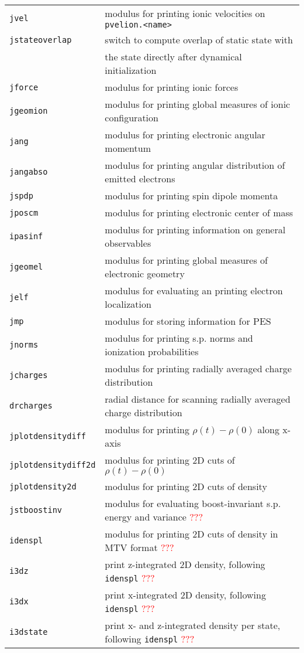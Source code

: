 \documentclass[12pt]{article}
\begin{document}
\begin{tabular}{ll}
\\
{\tt jvel}           & modulus for printing ionic velocities on {\tt pvelion.<name>}
\\
{\tt jstateoverlap}  & switch to compute overlap of static state
                       with\\
                     & the state directly after dynamical
                       initialization
\\
{\tt jforce} & modulus for printing ionic forces \\
{\tt jgeomion} &  modulus for printing global measures of ionic configuration \\
{\tt jang} & modulus for printing electronic angular momentum  \\
{\tt jangabso} &  modulus for printing angular distribution of emitted
electrons\\
{\tt jspdp} &  modulus for printing spin dipole momenta \\
{\tt jposcm} &  modulus for printing electronic center of mass \\
{\tt ipasinf} &  modulus for printing information on general observables\\
{\tt jgeomel} &   modulus for printing global measures of electronic geometry \\
{\tt jelf} &  modulus for evaluating an printing electron localization\\
{\tt jmp} & modulus for storing information for PES \\
{\tt jnorms} & modulus for printing s.p. norms and ionization probabilities \\
{\tt jcharges} & modulus for printing radially averaged charge distribution \\
{\tt drcharges} & radial distance for scanning radially averaged charge distribution \\
{\tt jplotdensitydiff} &  modulus for printing $\rho(t)-\rho(0)$ along
x-axis\\
{\tt jplotdensitydiff2d} &   modulus for printing 2D cuts of $\rho(t)-\rho(0)$ \\
{\tt jplotdensity2d} &  modulus for printing 2D cuts of density  \\
{\tt jstboostinv} & modulus for evaluating boost-invariant s.p. energy
and variance \textcolor{red}{???}\\
{\tt idenspl} & modulus for printing 2D cuts of density in MTV format \textcolor{red}{???} \\
{\tt i3dz} &  print z-integrated 2D density, following {\tt idenspl} \textcolor{red}{???}\\
{\tt i3dx} &  print x-integrated 2D density, following {\tt idenspl} \textcolor{red}{???}\\
{\tt i3dstate} & print  x- and z-integrated density per state, following {\tt idenspl} \textcolor{red}{???}\\
\hline
\end{tabular}
\end{document}
